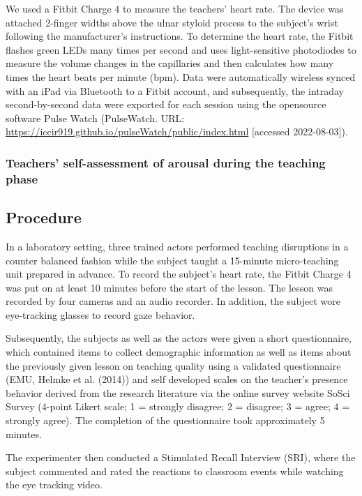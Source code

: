\documentclass[
  man]{apa6}
\begin{document}
We used a Fitbit Charge 4 to measure the teachers' heart rate. The device was attached 2-finger widths above the ulnar styloid process to the subject's wrist following the manufacturer's instructions. To determine the heart rate, the Fitbit flashes green LEDs many times per second and uses light-sensitive photodiodes to measure the volume changes in the capillaries and then calculates how many times the heart beats per minute (bpm). Data were automatically wireless synced with an iPad via Bluetooth to a Fitbit account, and subsequently, the intraday second-by-second data were exported for each session using the opensource software Pulse Watch (PulseWatch. URL: \url{https://iccir919.github.io/pulseWatch/public/index.html} {[}accessed 2022-08-03{]}).

\hypertarget{teachers-self-assessment-of-arousal-during-the-teaching-phase}{%
\subsubsection{Teachers' self-assessment of arousal during the teaching phase}\label{teachers-self-assessment-of-arousal-during-the-teaching-phase}}

\hypertarget{procedure}{%
\subsection{Procedure}\label{procedure}}

In a laboratory setting, three trained actors performed teaching disruptions in a counter balanced fashion while the subject taught a 15-minute micro-teaching unit prepared in advance. To record the subject's heart rate, the Fitbit Charge 4 was put on at least 10 minutes before the start of the lesson. The lesson was recorded by four cameras and an audio recorder. In addition, the subject wore eye-tracking glasses to record gaze behavior.

Subsequently, the subjects as well as the actors were given a short questionnaire, which contained items to collect demographic information as well as items about the previously given lesson on teaching quality using a validated questionnaire (EMU, Helmke et al. (2014)) and self developed scales on the teacher's presence behavior derived from the research literature via the online survey website SoSci Survey (4-point Likert scale; 1 = strongly disagree; 2 = disagree; 3 = agree; 4 = strongly agree). The completion of the questionnaire took approximately 5 minutes.

The experimenter then conducted a Stimulated Recall Interview (SRI), where the subject commented and rated the reactions to classroom events while watching the eye tracking video.
\end{document}
